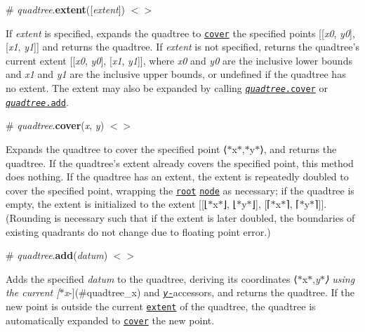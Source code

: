 \label{_quadtree_extent}%
\# {\itshape quadtree}.{\bfseries extent}(\mbox{[}{\itshape extent}\mbox{]}) \href{https://github.com/d3/d3-quadtree/blob/master/src/extent.js}{\tt $<$$>$}

If {\itshape extent} is specified, expands the quadtree to \href{#quadtree_cover}{\tt cover} the specified points \mbox{[}\mbox{[}{\itshape x0}, {\itshape y0}\mbox{]}, \mbox{[}{\itshape x1}, {\itshape y1}\mbox{]}\mbox{]} and returns the quadtree. If {\itshape extent} is not specified, returns the quadtree’s current extent \mbox{[}\mbox{[}{\itshape x0}, {\itshape y0}\mbox{]}, \mbox{[}{\itshape x1}, {\itshape y1}\mbox{]}\mbox{]}, where {\itshape x0} and {\itshape y0} are the inclusive lower bounds and {\itshape x1} and {\itshape y1} are the inclusive upper bounds, or undefined if the quadtree has no extent. The extent may also be expanded by calling \href{#quadtree_cover}{\tt {\itshape quadtree}.cover} or \href{#quadtree_add}{\tt {\itshape quadtree}.add}.

\label{_quadtree_cover}%
\# {\itshape quadtree}.{\bfseries cover}({\itshape x}, {\itshape y}) \href{https://github.com/d3/d3-quadtree/blob/master/src/cover.js}{\tt $<$$>$}

Expands the quadtree to cover the specified point ⟨$\ast$x$\ast$,$\ast$y$\ast$⟩, and returns the quadtree. If the quadtree’s extent already covers the specified point, this method does nothing. If the quadtree has an extent, the extent is repeatedly doubled to cover the specified point, wrapping the \href{#quadtree_root}{\tt root} \href{#nodes}{\tt node} as necessary; if the quadtree is empty, the extent is initialized to the extent \mbox{[}\mbox{[}⌊$\ast$x$\ast$⌋, ⌊$\ast$y$\ast$⌋\mbox{]}, \mbox{[}⌈$\ast$x$\ast$⌉, ⌈$\ast$y$\ast$⌉\mbox{]}\mbox{]}. (Rounding is necessary such that if the extent is later doubled, the boundaries of existing quadrants do not change due to floating point error.)

\label{_quadtree_add}%
\# {\itshape quadtree}.{\bfseries add}({\itshape datum}) \href{https://github.com/d3/d3-quadtree/blob/master/src/add.js}{\tt $<$$>$}

Adds the specified {\itshape datum} to the quadtree, deriving its coordinates ⟨$\ast$x$\ast$,{\itshape y$\ast$⟩ using the current \mbox{[}$\ast$x}-\/\mbox{]}(\#quadtree\+\_\+x) and \href{#quadtree_y}{\tt {\itshape y}-\/}accessors, and returns the quadtree. If the new point is outside the current \href{#quadtree_extent}{\tt extent} of the quadtree, the quadtree is automatically expanded to \href{#quadtree_cover}{\tt cover} the new point.

